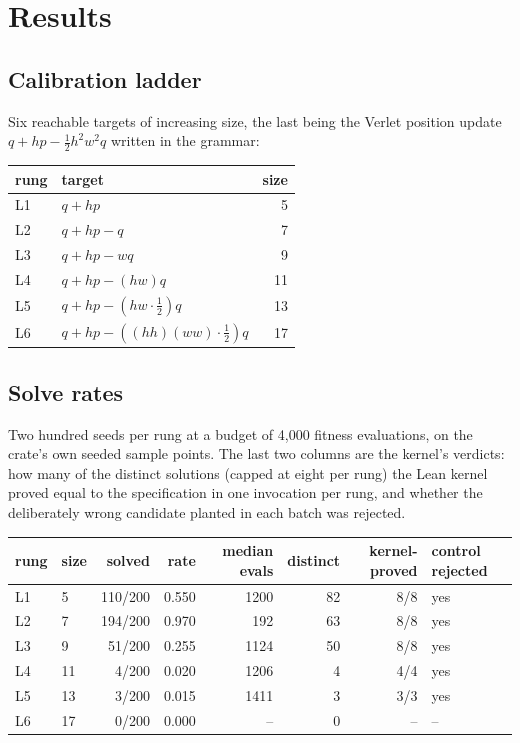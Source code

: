 \documentclass[11pt,a4paper]{article}
\theoremstyle{definition}
\theoremstyle{remark}
\begin{document}
\section{Results}

\subsection{Calibration ladder}

Six reachable targets of increasing size, the last being the Verlet position
update $q + hp - \tfrac12 h^2 w^2 q$ written in the grammar:

\begin{center}
\begin{tabular}{llr}
\toprule
rung & target & size \\
\midrule
L1 & $q + hp$ & 5 \\
L2 & $q + hp - q$ & 7 \\
L3 & $q + hp - wq$ & 9 \\
L4 & $q + hp - (hw)q$ & 11 \\
L5 & $q + hp - (hw\cdot\tfrac12)q$ & 13 \\
L6 & $q + hp - ((hh)(ww)\cdot\tfrac12)q$ & 17 \\
\bottomrule
\end{tabular}
\end{center}

\subsection{Solve rates}

Two hundred seeds per rung at a budget of 4,000 fitness evaluations, on the crate's own seeded sample points. The last two columns are the kernel's verdicts: how many of the distinct solutions (capped at eight per rung) the Lean kernel proved equal to the specification in one invocation per rung, and whether the deliberately wrong candidate planted in each batch was rejected.

\begin{center}
\begin{tabular}{llrrrrrl}
\toprule
rung & size & solved & rate & median evals & distinct & kernel-proved & control rejected \\
\midrule
L1 & 5 & 110/200 & 0.550 & 1200 & 82 & 8/8 & yes \\
L2 & 7 & 194/200 & 0.970 & 192 & 63 & 8/8 & yes \\
L3 & 9 & 51/200 & 0.255 & 1124 & 50 & 8/8 & yes \\
L4 & 11 & 4/200 & 0.020 & 1206 & 4 & 4/4 & yes \\
L5 & 13 & 3/200 & 0.015 & 1411 & 3 & 3/3 & yes \\
L6 & 17 & 0/200 & 0.000 & -- & 0 & -- & -- \\
\bottomrule
\end{tabular}
\end{center}
\end{document}
